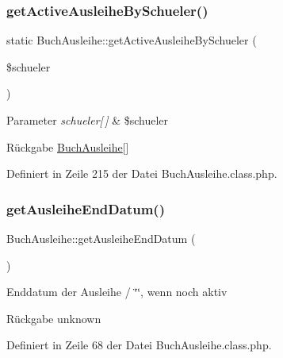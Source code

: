 \subsubsection{\texorpdfstring{get\+Active\+Ausleihe\+By\+Schueler()}{getActiveAusleiheBySchueler()}}
{\footnotesize\ttfamily static Buch\+Ausleihe\+::get\+Active\+Ausleihe\+By\+Schueler (\begin{DoxyParamCaption}\item[{}]{\$schueler }\end{DoxyParamCaption})\hspace{0.3cm}{\ttfamily [static]}}


\begin{DoxyParams}{Parameter}
{\em schueler\mbox{[}$\,$\mbox{]}} & \$schueler \\
\hline
\end{DoxyParams}
\begin{DoxyReturn}{Rückgabe}
\mbox{\hyperlink{class_buch_ausleihe}{Buch\+Ausleihe}}\mbox{[}\mbox{]} 
\end{DoxyReturn}


Definiert in Zeile 215 der Datei Buch\+Ausleihe.\+class.\+php.

\mbox{\label{class_buch_ausleihe_aef028e0218f9fa040a010dd84a4d3416}} 
\subsubsection{\texorpdfstring{get\+Ausleihe\+End\+Datum()}{getAusleiheEndDatum()}}
{\footnotesize\ttfamily Buch\+Ausleihe\+::get\+Ausleihe\+End\+Datum (\begin{DoxyParamCaption}{ }\end{DoxyParamCaption})}

Enddatum der Ausleihe / \char`\"{}\char`\"{}, wenn noch aktiv \begin{DoxyReturn}{Rückgabe}
unknown 
\end{DoxyReturn}


Definiert in Zeile 68 der Datei Buch\+Ausleihe.\+class.\+php.

\mbox{\label{class_buch_ausleihe_a618cf53c891c96f350f2545b6b16b6f0}} 
